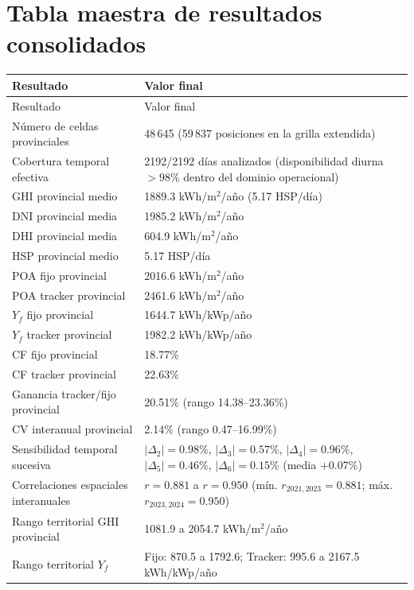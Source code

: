 \documentclass[11pt,a4paper]{article}
\begin{document}
\section{Tabla maestra de resultados consolidados}

\begin{longtable}{p{}p{}}
\toprule
Resultado & Valor final \\
\midrule
\endfirsthead
\toprule
Resultado & Valor final \\
\midrule
\endhead

Número de celdas provinciales & 48\,645 (59\,837 posiciones en la grilla extendida) \\
Cobertura temporal efectiva & 2192/2192 días analizados (disponibilidad diurna $>98\%$ dentro del dominio operacional) \\
GHI provincial medio & 1889.3 kWh/m$^2$/año (5.17 HSP/día) \\
DNI provincial media & 1985.2 kWh/m$^2$/año \\
DHI provincial media & 604.9 kWh/m$^2$/año \\
HSP provincial medio & 5.17 HSP/día \\
POA fijo provincial & 2016.6 kWh/m$^2$/año \\
POA tracker provincial & 2461.6 kWh/m$^2$/año \\
$Y_f$ fijo provincial & 1644.7 kWh/kWp/año \\
$Y_f$ tracker provincial & 1982.2 kWh/kWp/año \\
CF fijo provincial & 18.77\% \\
CF tracker provincial & 22.63\% \\
Ganancia tracker/fijo provincial & 20.51\% (rango 14.38--23.36\%) \\
CV interanual provincial & 2.14\% (rango 0.47--16.99\%) \\
Sensibilidad temporal sucesiva & $|\Delta_2|=0.98\%$, $|\Delta_3|=0.57\%$, $|\Delta_4|=0.96\%$, $|\Delta_5|=0.46\%$, $|\Delta_6|=0.15\%$ (media $+0.07\%$) \\
Correlaciones espaciales interanuales & $r=0.881$ a $r=0.950$ (mín. $r_{2021,2023}=0.881$; máx. $r_{2023,2024}=0.950$) \\
Rango territorial GHI provincial & 1081.9 a 2054.7 kWh/m$^2$/año \\
Rango territorial $Y_f$ & Fijo: 870.5 a 1792.6; Tracker: 995.6 a 2167.5 kWh/kWp/año \\

\end{longtable}
\end{document}
